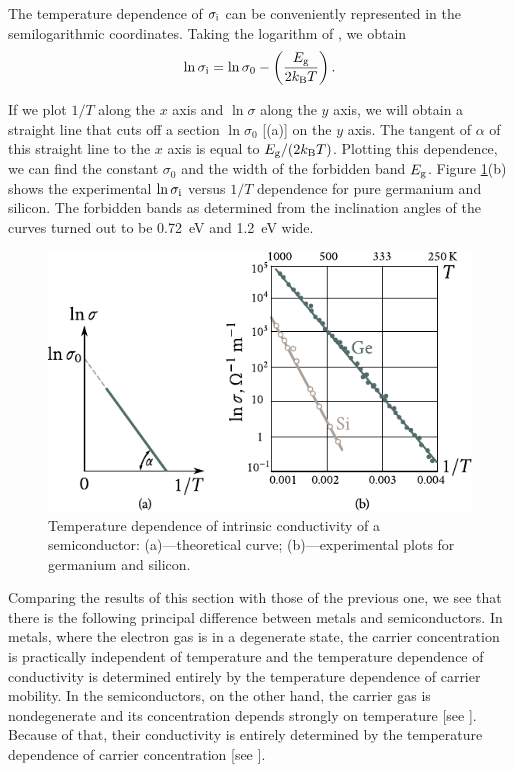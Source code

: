 The temperature dependence of $\sigma_{\text{i}}$ can be conveniently represented in the semilogarithmic coordinates. Taking the logarithm of , we obtain
\begin{equation}\label{eq:6_37}
	\ln{\sigma_{\text{i}}} = \ln{\sigma_0} - \left(\frac{E_{\text{g}}}{2k_{\text{B}}T}\right).
\end{equation}

\noindent
If we plot $1/T$ along the $x$ axis and $\ln{\sigma}$ along the $y$ axis, we will obtain a straight line that cuts off a section $\ln{\sigma_0}$ [(a)] on the $y$ axis. The tangent of $\alpha$ of this straight line to the $x$ axis is equal to $E_{\text{g}}/(2k_{\text{B}}T)$. Plotting this dependence, we can find the constant $\sigma_0$ and the width of the forbidden band $E_{\text{g}}$.
Figure \ref{fig:6_13}(b) shows the experimental $\ln{\sigma_{\text{i}}}$ versus $1/T$ dependence for pure germanium and silicon. The forbidden bands as determined from the inclination angles of the curves turned out to be \SI{0.72}{\electronvolt} and \SI{1.2}{\electronvolt} wide.

\begin{figure}[t]
	\begin{center}
		\includegraphics[scale=1]{figures/ch_06/fig_6_13.pdf}
		\caption[]{Temperature dependence of intrinsic conductivity of a semiconductor: (a)---theoretical curve; (b)---experimental plots for germanium and silicon.}
		\label{fig:6_13}
	\end{center}
	\vspace{-0.7cm}
\end{figure}

Comparing the results of this section with those of the previous one, we see that there is the following principal difference between metals and semiconductors. In metals, where the electron gas is in a degenerate state, the carrier concentration is practically independent of temperature and the temperature dependence of conductivity is determined entirely by the temperature dependence of carrier mobility. In the semiconductors, on the other hand, the carrier gas is nondegenerate and its concentration depends strongly on temperature [see ]. Because of that, their conductivity is entirely determined by the temperature dependence of carrier concentration [see ].


